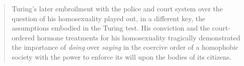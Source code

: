 \begin{quote}
	Turing's later embroilment with the police and court system over the question of his homosexuality played out, in a different key, the assumptions embodied in the Turing test. His conviction and the court-ordered hormone treatments for his homosexuality tragically demonstrated the importance of \textit{doing} over \textit{saying} in the coercive order of a homophobic society with the power to enforce its will upon the bodies of its citizens. \parencite[xii]{Hay99:How}
\end{quote}













